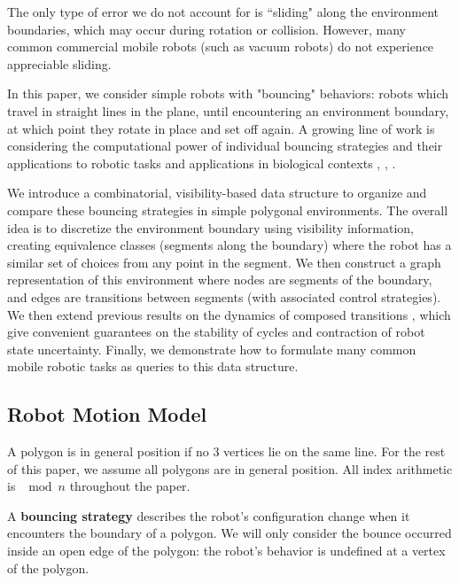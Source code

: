 \documentclass[]{styles/svproc}  %
\begin{document}
The only type of error we do not
account for is ``sliding" along the environment boundaries, which may occur
during rotation or collision. However, many common commercial mobile robots
(such as vacuum robots) do not experience appreciable sliding.

In this paper, we consider simple robots with "bouncing" behaviors: robots which
travel in straight lines in the plane, until encountering an environment
boundary, at which point they rotate in place and set off again. A growing line
of work is considering the computational power of individual bouncing strategies
and their applications to robotic tasks and applications in biological contexts
\cite{ErLav13}, \cite{microorganism2017}, \cite{alam2017minimalist}.

We introduce a combinatorial, visibility-based data structure to organize and
compare these bouncing strategies in simple polygonal environments. The overall
idea is to discretize the environment boundary using visibility information,
creating equivalence classes (segments along the boundary) where the robot has a
similar set of choices from any point in the segment. We then construct a graph
representation of this environment where nodes are segments of the boundary, and
edges are transitions between segments (with associated control strategies). We
then extend previous results on the dynamics of composed transitions
\cite{NilBecLav17}, which give convenient guarantees on the stability of cycles
and contraction of robot state uncertainty. Finally, we demonstrate how to
formulate many common mobile robotic tasks as queries to this data structure.


\subsection{Robot Motion Model}\label{subsec:bounce_strategy}

A polygon is in general position if no $3$ vertices lie on the same line. For
the rest of this paper, we assume all polygons are in general position. All
index arithmetic is $\mod n$ throughout the paper.

A \textbf{bouncing strategy} describes the robot's configuration change when it
encounters the boundary of a polygon. We will only consider the bounce occurred
inside an open edge of the polygon: the robot's behavior is undefined at a
vertex of the polygon.
\end{document}
